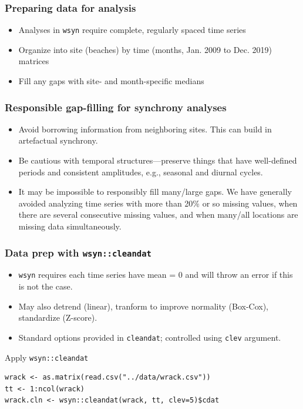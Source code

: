 \documentclass{beamer}
\begin{document}
\begin{frame}
\frametitle{Preparing data for analysis}
\begin{itemize}
\item Analyses in \texttt{wsyn} require complete, regularly spaced time series
\item Organize into site (beaches) by time (months, Jan. 2009 to Dec. 2019) matrices
\item Fill any gaps with site- and month-specific medians
\end{itemize}
\end{frame}

\begin{frame}
\frametitle{Responsible gap-filling for synchrony analyses}
\begin{itemize}
\item Avoid borrowing information from neighboring sites. This can build in artefactual synchrony.
\item Be cautious with temporal structures---preserve things that have well-defined periods and consistent amplitudes, e.g., seasonal and diurnal cycles.
\item It may be impossible to responsibly fill many/large gaps. We have generally avoided analyzing time series with more than 20\% or so missing values, when there are several consecutive missing values, and when many/all locations are missing data simultaneously.
\end{itemize}
\end{frame}

\begin{frame}[fragile]
\frametitle{Data prep with \texttt{wsyn::cleandat}}
\begin{itemize}
\item \texttt{wsyn} requires each time series have mean = 0 and will throw an error if this is not the case.
\item May also detrend (linear), tranform to improve normality (Box-Cox), standardize (Z-score). 
\item Standard options provided in \texttt{cleandat}; controlled using \texttt{clev} argument.
\end{itemize}
\begin{exampleblock}{Apply \texttt{wsyn::cleandat}}
\begin{verbatim}
wrack <- as.matrix(read.csv("../data/wrack.csv"))
tt <- 1:ncol(wrack)
wrack.cln <- wsyn::cleandat(wrack, tt, clev=5)$cdat 
\end{verbatim}
\end{exampleblock}
\end{frame}
\end{document}
